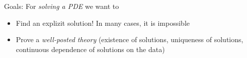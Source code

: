 \documentclass[ngerman, BCOR=5mm]{scrreprt}
\theoremstyle{tommy}
\begin{document}

Goals: For \emph{solving a PDE} we want to
\begin{itemize}
  \item Find an explizit solution! In many cases, it is impossible
  \item Prove a \emph{well-posted theory} (existence of solutions, uniqueness of solutions, continuous dependence of solutions on the data)
\end{itemize}
\end{document}
